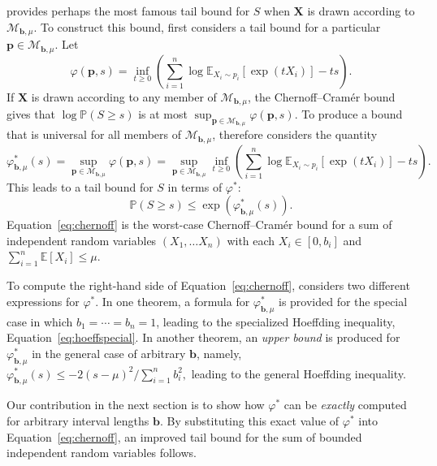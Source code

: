 \documentclass[12pt]{article}
\theoremstyle{plain}
\begin{document}
\citet[Theorem 2]{hoeffding_probability_1963} provides perhaps the most famous tail bound for $S$ when $\boldsymbol{X}$ is drawn according to $\mathcal{M}_{\boldsymbol{b},\mu}$.  To construct this bound, \citet{hoeffding_probability_1963} first considers a tail bound for a particular $\boldsymbol{p} \in \mathcal{M}_{\boldsymbol{b},\mu}$.
Let
\[
\varphi(\boldsymbol{p},s) = \inf_{t\geq 0} \left(\sum_{i=1}^n \log \mathbb{E}_{X_i \sim p_i}[\exp(t X_i)] - ts\right).
\]
If $\boldsymbol{X}$ is drawn according to any member of $\mathcal{M}_{\boldsymbol{b},\mu}$, the Chernoff--Cram\'er bound gives that $\log \mathbb{P} \left (S \geq s\right)$ is at most $\sup_{\boldsymbol{p} \in \mathcal{M}_{\boldsymbol{b},\mu}} \varphi(\boldsymbol{p},s)$.
To produce a bound that is universal for all members of $\mathcal{M}_{\boldsymbol{b},\mu}$, \citet{hoeffding_probability_1963} therefore considers the quantity
\begin{equation} \label{eq:varphistar}
\varphi^*_{\boldsymbol{b},\mu}(s) = \sup_{\boldsymbol{p} \in \mathcal{M}_{\boldsymbol{b},\mu}} \varphi(\boldsymbol{p},s) = \sup_{\boldsymbol{p} \in \mathcal{M}_{\boldsymbol{b},\mu}} \inf_{t\geq 0} \left(\sum_{i=1}^n \log \mathbb{E}_{X_i \sim p_i}[\exp(t X_i)] - ts\right).
\end{equation}
This leads to a tail bound for $S$ in terms of $\varphi^*$:
\begin{equation} \label{eq:chernoff}
\mathbb{P} \left (S \geq s\right) \leq \exp(\varphi^*_{\boldsymbol{b},\mu}(s)).
\end{equation}
Equation~\ref{eq:chernoff} is the worst-case Chernoff--Cram\'er bound for a sum of independent random variables $(X_1,\ldots X_n)$ with each $X_i \in [0,b_i]$ and $\sum_{i=1}^n \mathbb{E}[X_i]\leq \mu$.

To compute the right-hand side of Equation~\ref{eq:chernoff}, \citet{hoeffding_probability_1963} considers two different expressions for $\varphi^*$.  In one theorem, a formula for $\varphi^*_{\boldsymbol{b},\mu}$ is provided for the special case in which $b_1=\cdots=b_n=1$, leading to the specialized Hoeffding inequality, Equation~\ref{eq:hoeffspecial}.  In another theorem, an \emph{upper bound} is produced for $\varphi^*_{\boldsymbol{b},\mu}$ in the general case of arbitrary $\boldsymbol{b}$, namely,
$
\varphi^*_{\boldsymbol{b},\mu}(s)\leq -2(s-\mu)^2/\sum_{i=1}^n b_i^2,
$
leading to the general Hoeffding inequality.

Our contribution in the next section is to show how $\varphi^*$ can be \textit{exactly} computed for arbitrary interval lengths $\boldsymbol{b}$.
By substituting this exact value of $\varphi^*$ into Equation~\ref{eq:chernoff}, an improved tail bound for the sum of bounded independent random variables follows.
\end{document}
